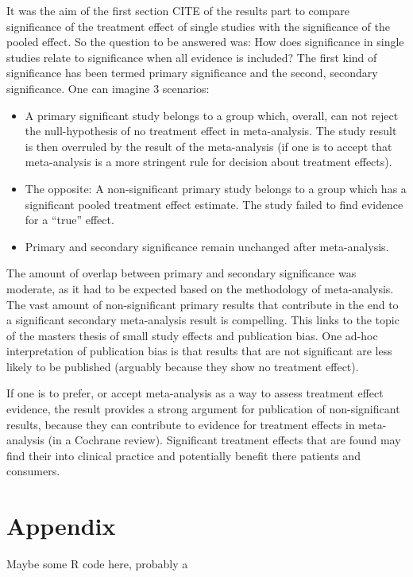 \documentclass[11pt,a4paper,twoside]{book}\usepackage[]{graphicx}\usepackage[]{color}
\begin{document}
\vspace{0mm}
It was the aim of the first section CITE of the results part to compare significance of the treatment effect of single studies with the significance of the pooled effect. So the question to be answered was: How does significance in single studies relate to significance when all evidence is included? The first kind of significance has been termed primary significance and the second, secondary significance. One can imagine 3 scenarios: 
\begin{itemize}
\item A primary significant study belongs to a group which, overall, can not reject the null-hypothesis of no treatment effect in meta-analysis. The study result is then overruled by the result of the meta-analysis (if one is to accept that meta-analysis is a more stringent rule for decision about treatment effects).
\item The opposite: A non-significant primary study belongs to a group which has a significant pooled treatment effect estimate. The study failed to find evidence for a ``true'' effect.
\item Primary and secondary significance remain unchanged after meta-analysis.
\end{itemize}

The amount of overlap between primary and secondary significance was moderate, as it had to be expected based on the methodology of meta-analysis. The vast amount of non-significant primary results that contribute in the end to a significant secondary meta-analysis result is compelling. This links to the topic of the masters thesis of small study effects and publication bias. One ad-hoc interpretation of publication bias is that results that are not significant are less likely to be published (arguably because they show no treatment effect). 

\vspace{0mm}
If one is to prefer, or accept meta-analysis as a way to assess treatment effect evidence, the result provides a strong argument for publication of non-significant results, because they can contribute to evidence for treatment effects in meta-analysis (in a Cochrane review). Significant treatment effects that are found may find their into clinical practice and potentially benefit there patients and consumers. 


\appendix




\chapter{Appendix}

Maybe some R code here, probably a 




\cleardoublepage
{}
{}


 


\cleardoublepage
\end{document}
